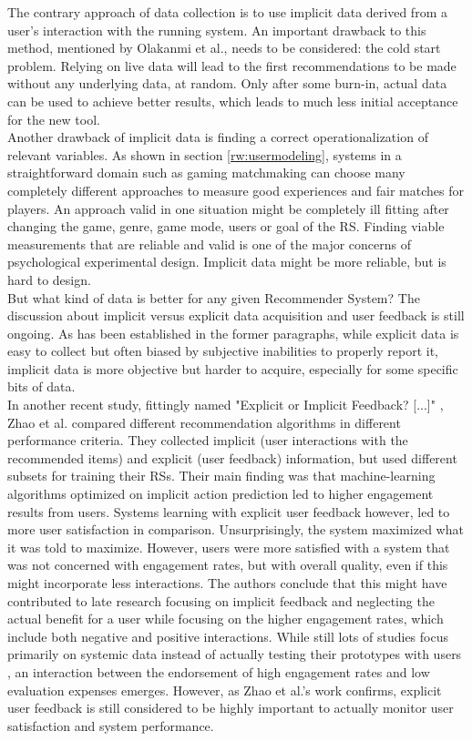 \documentclass[conference]{IEEEtran}
\begin{document}
The contrary approach of data collection is to  use implicit data derived from a user's interaction with the running system. An important drawback to this method, mentioned by Olakanmi et al., needs to be considered: the cold start problem. \cite{olakanmi2017group} Relying on live data will lead to the first recommendations to be made without any underlying data, at random. Only after some burn-in, actual data can be used to achieve better results, which leads to much less initial acceptance for the new tool.\\
Another drawback of implicit data is finding a correct operationalization of relevant variables. As shown in section \ref{rw:usermodeling}, systems in a straightforward domain such as gaming matchmaking can choose many completely different approaches to measure good experiences and fair matches for players. An approach valid in one situation might be completely ill fitting after changing the game, genre, game mode, users or goal of the RS. Finding viable measurements that are reliable and valid is one of the major concerns of psychological experimental design. Implicit data might be more reliable, but is hard to design.\\
But what kind of data is better for any given Recommender System? The discussion about implicit versus explicit data acquisition and user feedback is still ongoing. As has been established in the former paragraphs, while explicit data is easy to collect but often biased by subjective inabilities to properly report it, implicit data is more objective but harder to acquire, especially for some specific bits of data.\\
In another recent study, fittingly named "Explicit or Implicit Feedback? [...]" \cite{zhao2018explicit}, Zhao et al. compared different recommendation algorithms in different performance criteria. They collected implicit (user interactions with the recommended items) and explicit (user feedback) information, but used different subsets for training their RSs. Their main finding was that machine-learning algorithms optimized on implicit action prediction led to higher engagement results from users. Systems learning with explicit user feedback however, led to more user satisfaction in comparison. Unsurprisingly, the system maximized what it was told to maximize. However, users were more satisfied with a system that was not concerned with engagement rates, but with overall quality, even if this might incorporate less interactions. The authors conclude that this might have contributed to late research focusing on implicit feedback and neglecting the actual benefit for a user while focusing on the higher engagement rates, which include both negative and positive interactions. While still lots of studies focus primarily on systemic data instead of actually testing their prototypes with users \cite{7994718}, an interaction between the endorsement of high engagement rates and low evaluation expenses emerges. However, as Zhao et al.'s work confirms, explicit user feedback is still considered to be highly important to actually monitor user satisfaction and system performance. \cite{BUDER2012207, 7994718}\\
\end{document}
